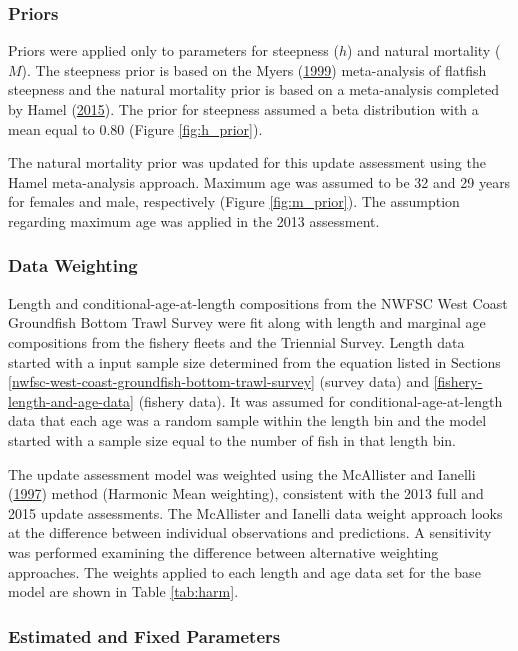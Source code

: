 \documentclass[12pt,]{article}
\begin{document}
\subsubsection{Priors}\label{priors}

Priors were applied only to parameters for steepness (\(h\)) and natural
mortality (\(M\)). The steepness prior is based on the Myers
(\protect\hyperlink{ref-myers_maximum_1999}{1999}) meta-analysis of
flatfish steepness and the natural mortality prior is based on a
meta-analysis completed by Hamel
(\protect\hyperlink{ref-hamel_method_2015}{2015}). The prior for
steepness assumed a beta distribution with a mean equal to 0.80 (Figure
\ref{fig:h_prior}).

The natural mortality prior was updated for this update assessment using
the Hamel meta-analysis approach. Maximum age was assumed to be 32 and
29 years for females and male, respectively (Figure \ref{fig:m_prior}).
The assumption regarding maximum age was applied in the 2013 assessment.

\subsubsection{Data Weighting}\label{data-weighting}

Length and conditional-age-at-length compositions from the NWFSC West
Coast Groundfish Bottom Trawl Survey were fit along with length and
marginal age compositions from the fishery fleets and the Triennial
Survey. Length data started with a input sample size determined from the
equation listed in Sections
\ref{nwfsc-west-coast-groundfish-bottom-trawl-survey} (survey data) and
\ref{fishery-length-and-age-data} (fishery data). It was assumed for
conditional-age-at-length data that each age was a random sample within
the length bin and the model started with a sample size equal to the
number of fish in that length bin.

The update assessment model was weighted using the McAllister and
Ianelli (\protect\hyperlink{ref-mcallister_bayesian_1997}{1997}) method
(Harmonic Mean weighting), consistent with the 2013 full and 2015 update
assessments. The McAllister and Ianelli data weight approach looks at
the difference between individual observations and predictions. A
sensitivity was performed examining the difference between alternative
weighting approaches. The weights applied to each length and age data
set for the base model are shown in Table \ref{tab:harm}.

\subsubsection{Estimated and Fixed
Parameters}\label{estimated-and-fixed-parameters}
\end{document}
